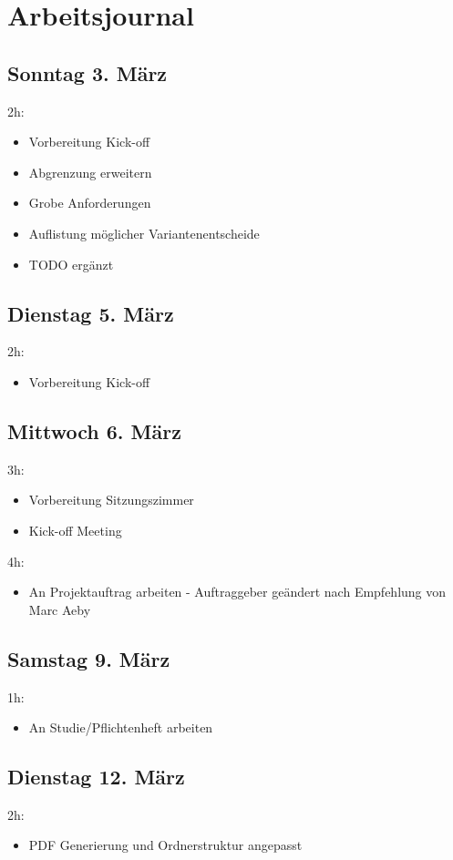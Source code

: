 \chapter{Arbeitsjournal}

\label{AppendixArbeitsjournal}

\section{Sonntag 3. März}\label{sonntag-3.-muxe4rz}

2h:

\begin{itemize}
\tightlist
\item
  Vorbereitung Kick-off
\item
  Abgrenzung erweitern
\item
  Grobe Anforderungen
\item
  Auflistung möglicher Variantenentscheide
\item
  TODO ergänzt
\end{itemize}

\section{Dienstag 5. März}\label{dienstag-5.muxe4rz}

2h:

\begin{itemize}
\tightlist
\item
  Vorbereitung Kick-off
\end{itemize}

\section{Mittwoch 6. März}\label{mittwoch-6.muxe4rz}

3h:

\begin{itemize}
\tightlist
\item
  Vorbereitung Sitzungszimmer
\item
  Kick-off Meeting
\end{itemize}

4h:

\begin{itemize}
\tightlist
\item
  An Projektauftrag arbeiten - Auftraggeber geändert nach Empfehlung
  von Marc Aeby
\end{itemize}

\section{Samstag 9. März}\label{samstag-9.muxe4rz}

1h:

\begin{itemize}
\tightlist
\item
  An Studie/Pflichtenheft arbeiten
\end{itemize}

\section{Dienstag 12. März}\label{dienstag-12.muxe4rz}

2h:

\begin{itemize}
\tightlist
\item
  PDF Generierung und Ordnerstruktur angepasst
\end{itemize}
